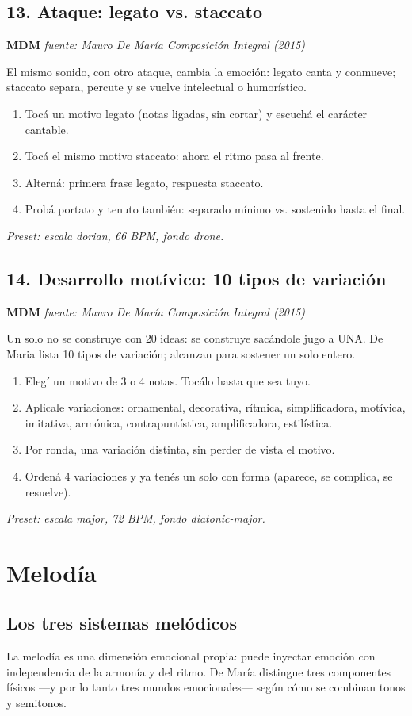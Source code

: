 \documentclass[11pt,a4paper]{article}
\begin{document}
\subsection{13. Ataque: legato vs. staccato}
\textbf{MDM} \hfill \emph{fuente: Mauro De María \textemdash{} Composición Integral (2015)}
\par El mismo sonido, con otro ataque, cambia la emoción: legato canta y conmueve; staccato separa, percute y se vuelve intelectual o humorístico.
\begin{enumerate}
\item Tocá un motivo legato (notas ligadas, sin cortar) y escuchá el carácter cantable.
\item Tocá el mismo motivo staccato: ahora el ritmo pasa al frente.
\item Alterná: primera frase legato, respuesta staccato.
\item Probá portato y tenuto también: separado mínimo vs. sostenido hasta el final.
\end{enumerate}
\emph{Preset: escala dorian, 66 BPM, fondo drone.}
\subsection{14. Desarrollo motívico: 10 tipos de variación}
\textbf{MDM} \hfill \emph{fuente: Mauro De María \textemdash{} Composición Integral (2015)}
\par Un solo no se construye con 20 ideas: se construye sacándole jugo a UNA. De Maria lista 10 tipos de variación; alcanzan para sostener un solo entero.
\begin{enumerate}
\item Elegí un motivo de 3 o 4 notas. Tocálo hasta que sea tuyo.
\item Aplicale variaciones: ornamental, decorativa, rítmica, simplificadora, motívica, imitativa, armónica, contrapuntística, amplificadora, estilística.
\item Por ronda, una variación distinta, sin perder de vista el motivo.
\item Ordená 4 variaciones y ya tenés un solo con forma (aparece, se complica, se resuelve).
\end{enumerate}
\emph{Preset: escala major, 72 BPM, fondo diatonic-major.}
\newpage
\section{Melod\'ia}
\subsection{Los tres sistemas mel\'odicos}
La melod\'ia es una dimensi\'on emocional propia: puede inyectar emoci\'on con independencia de la armon\'ia y del ritmo. De Mar\'ia distingue tres componentes f\'isicos —y por lo tanto tres mundos emocionales— seg\'un c\'omo se combinan tonos y semitonos.
\end{document}

